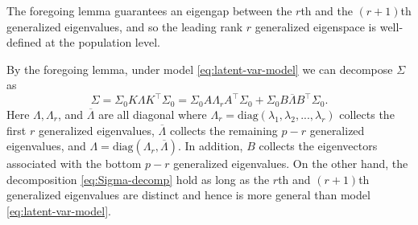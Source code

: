 \documentclass[11pt]{article}
\newcommand{\nb}[1]{\textcolor{orange}{\texttt{[#1]}}}
\newcommand{\LambdaRest}{\overline{\Lambda}} %
\newcommand{\0}{{\mathbf{0}}}
\begin{document}
The foregoing lemma guarantees an eigengap between the $r$th and the $(r+1)$th generalized eigenvalues, and so the leading rank $r$ generalized eigenspace is well-defined at the  population level.



By the foregoing lemma, under model \eqref{eq:latent-var-model} we can decompose $\Sigma$ as
\begin{equation}
      \label{eq:Sigma-decomp}
\Sigma=\Sigma_0 K { \Lambda} K^\top \Sigma_0=\Sigma_0 A\Lambda_r A^\top \Sigma_0+\Sigma_0 B {\LambdaRest} B^\top \Sigma_0.
\end{equation}
Here ${ \Lambda}, \Lambda_r$, and ${\LambdaRest}$ are all diagonal where $\Lambda_r=\text{diag}(\lambda_1,\lambda_2,...,\lambda_r)$ collects the first $r$ generalized eigenvalues, 
${\LambdaRest}$ collects the remaining $p-r$ generalized eigenvalues, 
and ${\Lambda} = \mathrm{diag}(\Lambda_r, {\LambdaRest})$. 
In addition, $B$ collects the eigenvectors associated with the bottom $p-r$ generalized eigenvalues.
 On the other hand, the decomposition \eqref{eq:Sigma-decomp} hold as long as the $r$th and $(r+1)$th generalized eigenvalues are distinct and hence is more general than model \eqref{eq:latent-var-model}.
\end{document}
